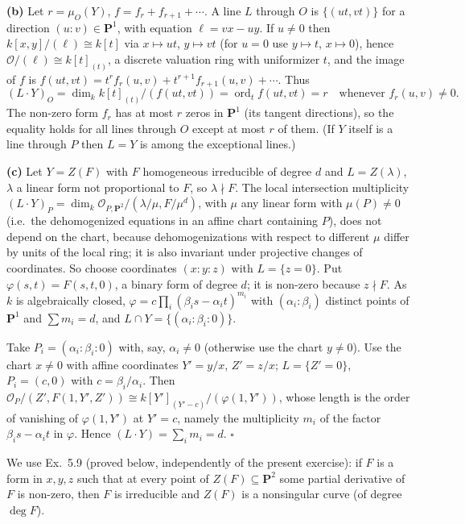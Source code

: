 \documentclass[11pt]{article}
\begin{document}
\textbf{(b)} Let $r=\mu_O(Y)$, $f=f_r+f_{r+1}+\cdots$. A line $L$ through $O$ is $\{(ut,vt)\}$ for a direction $(u:v)\in\mathbf P^1$, with equation $\ell=vx-uy$. If $u\neq0$ then $k[x,y]/(\ell)\cong k[t]$ via $x\mapsto ut$, $y\mapsto vt$ (for $u=0$ use $y\mapsto t$, $x\mapsto 0$), hence $\mathcal O/(\ell)\cong k[t]_{(t)}$, a discrete valuation ring with uniformizer $t$, and the image of $f$ is $f(ut,vt)=t^rf_r(u,v)+t^{r+1}f_{r+1}(u,v)+\cdots$. Thus
\[
(L\cdot Y)_O=\dim_k k[t]_{(t)}/(f(ut,vt))=\operatorname{ord}_tf(ut,vt)=r\quad\text{whenever } f_r(u,v)\neq0 .
\]
The non-zero form $f_r$ has at most $r$ zeros in $\mathbf P^1$ (its tangent directions), so the equality holds for all lines through $O$ except at most $r$ of them. (If $Y$ itself is a line through $P$ then $L=Y$ is among the exceptional lines.)

\textbf{(c)} Let $Y=Z(F)$ with $F$ homogeneous irreducible of degree $d$ and $L=Z(\lambda)$, $\lambda$ a linear form not proportional to $F$, so $\lambda\nmid F$. The local intersection multiplicity $(L\cdot Y)_P=\dim_k\mathcal O_{P,\mathbf P^2}/(\lambda/\mu,F/\mu^d)$, with $\mu$ any linear form with $\mu(P)\ne0$ (i.e.\ the dehomogenized equations in an affine chart containing $P$), does not depend on the chart, because dehomogenizations with respect to different $\mu$ differ by units of the local ring; it is also invariant under projective changes of coordinates. So choose coordinates $(x:y:z)$ with $L=\{z=0\}$. Put $\varphi(s,t)=F(s,t,0)$, a binary form of degree $d$; it is non-zero because $z\nmid F$. As $k$ is algebraically closed, $\varphi=c\prod_{i}(\beta_is-\alpha_it)^{m_i}$ with $(\alpha_i:\beta_i)$ distinct points of $\mathbf P^1$ and $\sum m_i=d$, and $L\cap Y=\{(\alpha_i:\beta_i:0)\}$.

Take $P_i=(\alpha_i:\beta_i:0)$ with, say, $\alpha_i\ne0$ (otherwise use the chart $y\neq0$). Use the chart $x\ne0$ with affine coordinates $Y'=y/x$, $Z'=z/x$; $L=\{Z'=0\}$, $P_i=(c,0)$ with $c=\beta_i/\alpha_i$. Then $\mathcal O_P/(Z',F(1,Y',Z'))\cong k[Y']_{(Y'-c)}/(\varphi(1,Y'))$, whose length is the order of vanishing of $\varphi(1,Y')$ at $Y'=c$, namely the multiplicity $m_i$ of the factor $\beta_is-\alpha_it$ in $\varphi$. Hence $(L\cdot Y)=\sum_im_i=d$. \hfill$\square$

\pf
We use Ex.~5.9 (proved below, independently of the present exercise): if $F$ is a form in $x,y,z$ such that at every point of $Z(F)\subseteq\mathbf P^2$ some partial derivative of $F$ is non-zero, then $F$ is irreducible and $Z(F)$ is a nonsingular curve (of degree $\deg F$).
\end{document}
